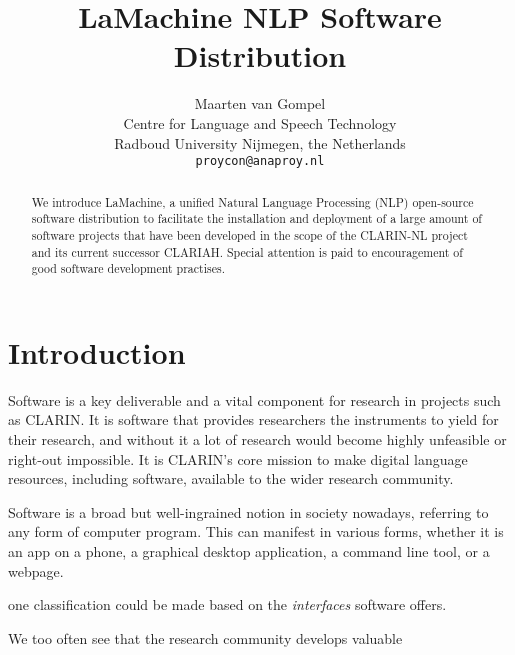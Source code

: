 \documentclass[a4paper,11pt]{article}
\title{LaMachine NLP Software Distribution}
\author{Maarten van Gompel \\
  Centre for Language and Speech Technology \\
  Radboud University Nijmegen, the Netherlands \\
  {\tt proycon@anaproy.nl} \\ %
}
\date{}
\begin{document}
\maketitle

\begin{abstract}
We introduce LaMachine, a unified Natural Language Processing (NLP) open-source
software distribution to facilitate the installation and deployment of a large
amount of software projects that have been developed in the scope of the
CLARIN-NL project and its current successor CLARIAH. Special attention is paid
to encouragement of good software development practises.
\end{abstract}

\section{Introduction} \label{intro}

Software is a key deliverable and a vital component for research in projects
such as CLARIN. It is software that provides researchers the instruments to
yield for their research, and without it a lot of research would become highly
unfeasible or right-out impossible. It is CLARIN's core mission to make digital
language resources, including software, available to the wider research
community.

Software is a broad but well-ingrained notion in society nowadays, referring to
any form of computer program. This can manifest in various forms, whether it is
an app on a phone, a graphical desktop application, a command line tool,  or a
webpage.

one classification could be
made based on the \emph{interfaces} software offers.








We too often see that the research community develops valuable
\end{document}
